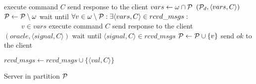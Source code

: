 \begin{algorithm}[h!]
\small

\begin{distribalgo}[1]

		\STATE execute command $C$
		\STATE send response to the client
\ENDINDENT
\vspace{1.0mm}
			\STATE $vars \leftarrow \omega \cap \mathcal{P}$
			\STATE \rmcast$(\mathcal{P}_d, \langle vars, C \rangle)$
			\STATE $\mathcal{P} \leftarrow \mathcal{P} \setminus \omega$
			\STATE wait until $\forall v \in \omega \setminus \mathcal{P}: \exists \langle vars, C \rangle \in rcvd\_msgs :$\\ ~~~~~$v \in vars$
				\STATE execute command $C$
				\STATE send response to the client
		\ENDIF
	\ENDINDENT
	\vspace{1.0mm}
		\STATE \rmcast$(oracle, \langle signal, C \rangle )$
		\STATE wait until $\langle signal, C \rangle \in rcvd\_msgs$
		\STATE $\mathcal{P} \leftarrow \mathcal{P} \cup \{v\}$
		\STATE send $ok$ to the client



	\ENDINDENT

  \vspace{1.0mm}

        \STATE $rcvd\_msgs \leftarrow rcvd\_msgs \cup \{\langle val, C \rangle\}$
  \ENDINDENT


\caption{Server in partition $\mathcal{P}$}
\label{alg:server_proxy}
\end{distribalgo}
\end{algorithm}